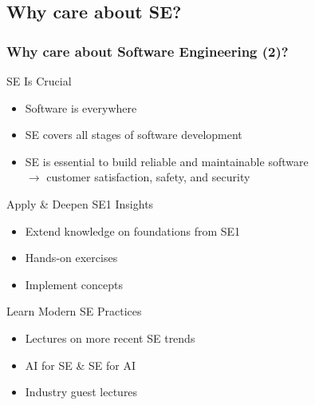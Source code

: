 \subsection{Why care about SE?}
\begin{frame}
	\frametitle{Why care about Software Engineering (2)?}
	\begin{fancycolumns}[columns=3, animation=keep,t]
		\begin{definition}{SE Is Crucial}
			\begin{itemize}
				\item Software is everywhere
				\item SE covers all stages of software development
				\item SE is essential to build reliable and maintainable software \\ $\rightarrow$ customer satisfaction, safety, and security
			\end{itemize}
		\end{definition}
		\nextcolumn
		\begin{definition}{Apply \& Deepen SE1 Insights}
			\begin{itemize}
				\item Extend knowledge on foundations from SE1
				\item Hands-on exercises
				\item Implement concepts
			\end{itemize}
		\end{definition}
		\nextcolumn
		\begin{definition}{Learn Modern SE Practices}
			\begin{itemize}
				\item Lectures on more recent SE trends
				\item AI for SE \& SE for AI
				\item Industry guest lectures
			\end{itemize}
		\end{definition}
	\end{fancycolumns}
	

\end{frame}




